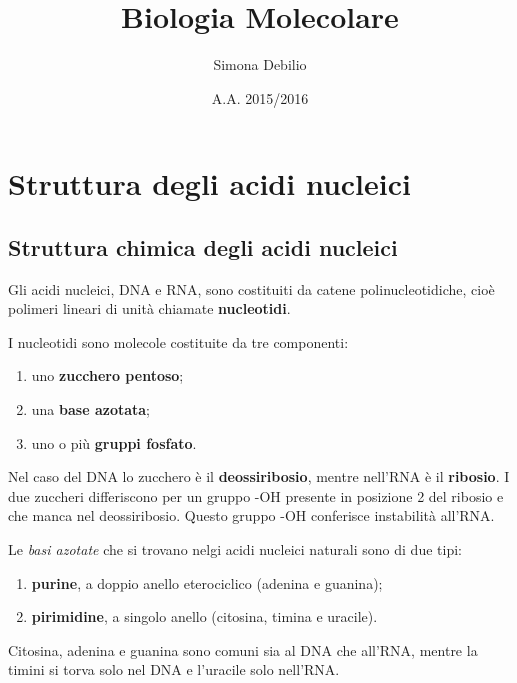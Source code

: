 \documentclass[11pt]{book}
\title{\textbf{Biologia Molecolare}}
\author{Simona Debilio}
\date{A.A. 2015/2016}
\date{}
\begin{document}
\maketitle

\tableofcontents


\chapter{Struttura degli acidi
nucleici}\label{struttura-degli-acidi-nucleici}

\section{Struttura chimica degli acidi
nucleici}\label{struttura-chimica-degli-acidi-nucleici}

Gli acidi nucleici, DNA e RNA, sono costituiti da catene
polinucleotidiche, cioè polimeri lineari di unità chiamate
\textbf{nucleotidi}.

I nucleotidi sono molecole costituite da tre componenti:

\begin{enumerate}
\def\labelenumi{\arabic{enumi}.}
\itemsep1pt\parskip0pt
\item
  uno \textbf{zucchero pentoso};
\item
  una \textbf{base azotata};
\item
  uno o più \textbf{gruppi fosfato}.
\end{enumerate}

Nel caso del DNA lo zucchero è il \textbf{deossiribosio}, mentre
nell'RNA è il \textbf{ribosio}. I due zuccheri differiscono per un
gruppo -OH presente in posizione 2 del ribosio e che manca nel
deossiribosio. Questo gruppo -OH conferisce instabilità all'RNA.

Le \emph{basi azotate} che si trovano nelgi acidi nucleici naturali sono
di due tipi:

\begin{enumerate}
\def\labelenumi{\arabic{enumi}.}
\itemsep1pt\parskip0pt
\item
  \textbf{purine}, a doppio anello eterociclico (adenina e guanina);
\item
  \textbf{pirimidine}, a singolo anello (citosina, timina e uracile).
\end{enumerate}

Citosina, adenina e guanina sono comuni sia al DNA che all'RNA, mentre
la timini si torva solo nel DNA e l'uracile solo nell'RNA.
\end{document}
